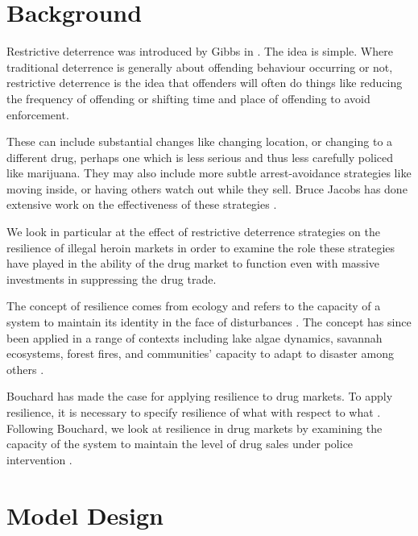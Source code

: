 \documentclass[runningheads,a4paper]{llncs}
\begin{document}
\section{Background}

Restrictive deterrence was introduced by Gibbs in \cite{gibbs_crime_1975}. The idea is simple. Where traditional deterrence is generally about offending behaviour occurring or not, restrictive deterrence is the idea that offenders will often do things like reducing the frequency of offending or shifting time and place of offending to avoid enforcement.

These can include substantial changes like changing location, or changing to a different drug, perhaps one which is less serious and thus less carefully policed like marijuana. They may also include more subtle arrest-avoidance strategies like moving inside, or having others watch out while they sell. Bruce Jacobs has done extensive work on the effectiveness of these strategies \cite{jacobs_undercover_1993,jacobs_crack_1996,jacobs_auto_2014}. %

We look in particular at the effect of restrictive deterrence strategies on the resilience of illegal heroin markets in order to examine the role these strategies have played in the ability of the drug market to function even with massive investments in suppressing the drug trade. 

The concept of resilience comes from ecology and refers to the capacity of a system to maintain its identity in the face of disturbances \cite{carpenter_metaphor_2001}. The concept has since been applied in a range of contexts including lake algae dynamics, savannah ecosystems, forest fires, and communities' capacity to adapt to disaster among others \cite{walker_thresholds_2004}.


Bouchard has made the case for applying resilience to drug markets. To apply resilience, it is necessary to specify resilience of what with respect to what \cite{carpenter_metaphor_2001}.
Following Bouchard, we look at resilience in drug markets by examining the capacity of the system to maintain the level of drug sales under police intervention \cite{bouchard_resilience_2007}.


\section{Model Design}
\end{document}
